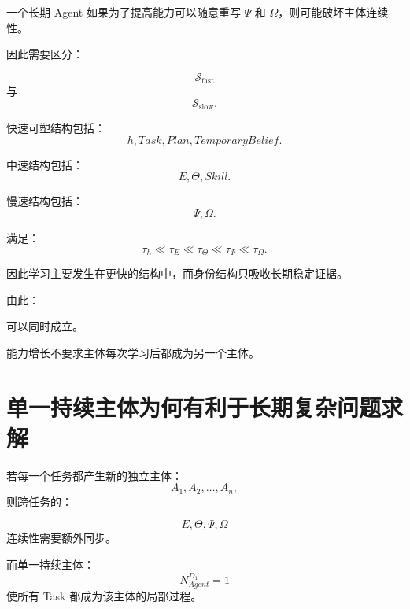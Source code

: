 一个长期 Agent 如果为了提高能力可以随意重写 $\Psi$ 和 $\Omega$，则可能破坏主体连续性。

因此需要区分：

\begin{equation}
\mathcal S_{\mathrm{fast}}
\end{equation}
与
\begin{equation}
\mathcal S_{\mathrm{slow}}.
\end{equation}

快速可塑结构包括：
\begin{equation}
h,
Task,
Plan,
TemporaryBelief.
\end{equation}

中速结构包括：
\begin{equation}
E,
\Theta,
Skill.
\end{equation}

慢速结构包括：
\begin{equation}
\Psi,
\Omega.
\end{equation}

满足：
\begin{equation}
\tau_h
\ll
\tau_E
\ll
\tau_\Theta
\ll
\tau_\Psi
\ll
\tau_\Omega.
\end{equation}

因此学习主要发生在更快的结构中，而身份结构只吸收长期稳定证据。

由此：
\begin{statementbox}
\centering
{}
\end{statementbox}
可以同时成立。

能力增长不要求主体每次学习后都成为另一个主体。

\section{单一持续主体为何有利于长期复杂问题求解}

若每一个任务都产生新的独立主体：
\begin{equation}
A_1,A_2,\ldots,A_n,
\end{equation}
则跨任务的：

\begin{equation}
E,
\Theta,
\Psi,
\Omega
\end{equation}
连续性需要额外同步。

而单一持续主体：
\begin{equation}
N_{Agent}^{D_1}=1
\end{equation}
使所有 Task 都成为该主体的局部过程。

